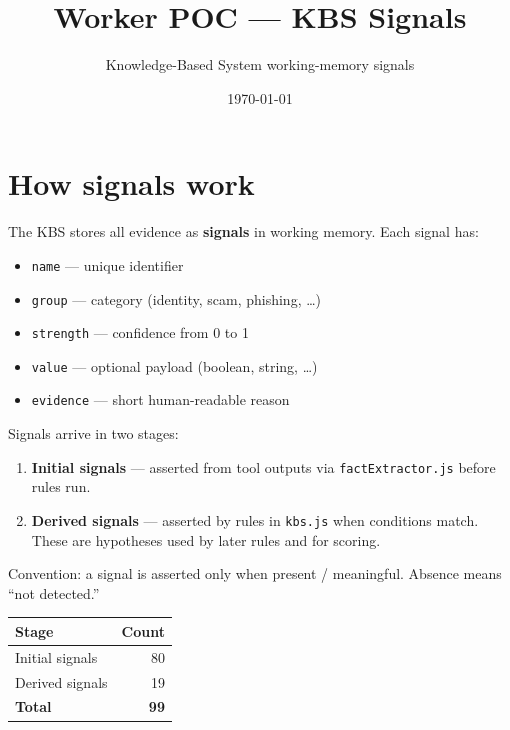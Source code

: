 \documentclass[11pt,a4paper]{article}
\title{\textbf{Worker POC --- KBS Signals}}
\author{Knowledge-Based System working-memory signals}
\date{\today}
\begin{document}
\maketitle

\section*{How signals work}

The KBS stores all evidence as \textbf{signals} in working memory. Each signal has:

\begin{itemize}
  \item \texttt{name} --- unique identifier
  \item \texttt{group} --- category (identity, scam, phishing, \ldots)
  \item \texttt{strength} --- confidence from 0 to 1
  \item \texttt{value} --- optional payload (boolean, string, \ldots)
  \item \texttt{evidence} --- short human-readable reason
\end{itemize}

Signals arrive in two stages:

\begin{enumerate}
  \item \textbf{Initial signals} --- asserted from tool outputs via \texttt{factExtractor.js} before rules run.
  \item \textbf{Derived signals} --- asserted by rules in \texttt{kbs.js} when conditions match. These are hypotheses used by later rules and for scoring.
\end{enumerate}

Convention: a signal is asserted only when present / meaningful. Absence means ``not detected.''

\begin{center}
\begin{tabular}{@{}lr@{}}
  \toprule
  \textbf{Stage} & \textbf{Count} \\
  \midrule
  Initial signals & 80 \\
  Derived signals & 19 \\
  \midrule
  \textbf{Total} & \textbf{99} \\
  \bottomrule
\end{tabular}
\end{center}

\end{document}
